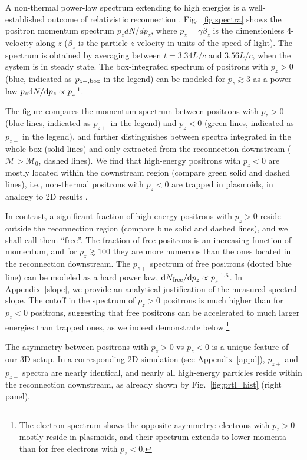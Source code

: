 \documentclass[twocolumn,twocolappendix]{aastex63}
\begin{document}
A non-thermal power-law spectrum extending to high energies is a well-established outcome of relativistic reconnection \citep[e.g.,][]{ss_14}. Fig.~\ref{fig:spectra} shows the positron momentum spectrum $p_z dN/dp_z$, where $p_z=\gamma \beta_z$ is the dimensionless 4-velocity along $z$ ($\beta_z$ is the particle $z$-velocity in units of the speed of light). The spectrum is obtained by averaging between $t = 3.34L/c$ and $3.56L/c$, when the system is in steady state. The box-integrated spectrum of positrons with $p_z>0$ (blue, indicated as $p_{z+,\rm box}$ in the legend) can be modeled for $p_z\gtrsim 3$  as a power law $p_z {\rm d}N/{\rm d}p_z \propto p_z ^{-1}$.

The figure compares the momentum spectrum between positrons with $p_z>0$ (blue lines, indicated as $p_{z+}$ in the legend) and $p_z<0$ (green lines, indicated as $p_{z-}$ in the legend), and further distinguishes between spectra integrated in the whole box (solid lines) and only extracted from the reconnection downstream ($\mathcal{M}>\mathcal{M}_0$, dashed lines). We find that high-energy positrons with $p_z<0$ are mostly located within the downstream region (compare green solid and dashed lines), i.e., non-thermal positrons with $p_z<0$ are trapped in plasmoids, in analogy to 2D results \citep[see][]{petropoulou_18, hakobyan_20}. 

In contrast, a significant fraction of high-energy positrons with $p_z > 0$ reside outside the reconnection region (compare blue solid and dashed lines), and we shall call them ``free''. The fraction of free positrons is an increasing function of momentum, and for $p_z\gtrsim 100$ they are more numerous than the ones located in the reconnection downstream. The $p_{z+}$ spectrum of free positrons (dotted blue line) can be modeled as a hard power law, ${\rm d}N_{\rm free}/{\rm d}p_z \propto p_z^{-1.5}$. In Appendix~\ref{slope}, we provide an analytical justification of the measured spectral slope. The cutoff in the spectrum of $p_z>0$ positrons is much higher than for $p_z<0$ positrons, suggesting that free positrons can be accelerated to much larger energies than trapped ones, as we indeed demonstrate below.\footnote{The electron spectrum shows the opposite asymmetry: electrons with $p_z>0$ mostly reside in plasmoids, and their spectrum extends to lower momenta than for free electrons with $p_z<0$.}

The asymmetry between positrons with $p_z>0$ vs  $p_z<0$ is a unique feature of our 3D setup. In a corresponding 2D simulation (see Appendix~\ref{appd}), $p_{z+}$ and $p_{z-}$ spectra are nearly identical, and nearly all  high-energy particles reside within the reconnection downstream, as already shown by Fig.~\ref{fig:prtl_hist} (right panel).
\end{document}
